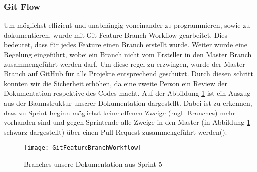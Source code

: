 \subsubsection{Git Flow}
Um möglichst effizient und unabhängig voneinander zu programmieren, sowie zu dokumentieren, wurde mit Git Feature Branch Workflow gearbeitet. Dies bedeutet, dass für jedes Feature einen Branch erstellt wurde. Weiter wurde eine Regelung eingeführt, wobei ein Branch nicht vom Ersteller in den Master Branch zusammengeführt werden darf. Um diese regel zu erzwingen, wurde der Master Branch auf GitHub für alle Projekte entsprechend geschützt. Durch diesen schritt konnten wir die Sicherheit erhöhen, da eine zweite Person ein Review der Dokumentation respektive des Codes macht.
Auf der Abbildung \ref{fig:FeatureBranchWorkflow} ist ein Auszug aus der Baumstruktur unserer Dokumentation dargestellt. Dabei ist zu erkennen, dass zu Sprint-beginn möglichst keine offenen Zweige (engl. Branches) mehr vorhanden sind und gegen Sprintende alle Zweige in den Master (in Abbildung \ref{fig:FeatureBranchWorkflow} schwarz dargestellt) über einen Pull Request zusammengeführt werden(\cite{BaumannWicki2018}).

\begin{figure}[htb]
	\center
	\texttt{[image: GitFeatureBranchWorkflow]}
	\caption{Branches unsere Dokumentation aus Sprint 5}
	\label{fig:FeatureBranchWorkflow}
\end{figure}

